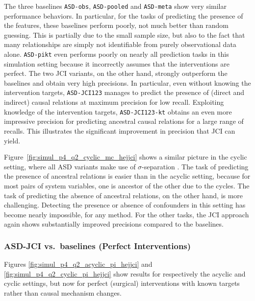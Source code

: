 \documentclass[twoside,11pt]{article}
\newcommand{\alg}[1]{\texttt{#1}}
\begin{document}
The three baselines \alg{ASD-obs}, \alg{ASD-pooled} and \alg{ASD-meta} show very similar performance behaviors.
In particular, for the tasks of predicting the presence of the features, these baselines perform poorly, not
much better than random guessing. This is partially due to the small sample size, but also to the fact that
many relationships are simply not identifiable from purely observational data alone.
\alg{ASD-pikt} even performs poorly on nearly all prediction tasks in this simulation setting because it 
incorrectly assumes that the interventions are perfect.
The two JCI variants, on the other hand, strongly outperform the baselines and obtain very high precisions. 
In particular, even without knowing the intervention targets, \alg{ASD-JCI123} manages to predict
the presence of (direct and indirect) causal relations at maximum precision for low recall. Exploiting knowledge of
the intervention targets, \alg{ASD-JCI123-kt} obtains an even more impressive precision 
for predicting ancestral causal relations for a large range of recalls. 
This illustrates the significant improvement in precision that JCI can yield.

Figure~\ref{fig:simul_p4_q2_cyclic_mc_hejjci} shows a similar picture in the cyclic setting, where all ASD variants
make use of $\sigma$-separation \citep{ForreMooij_UAI_18}. The task of predicting the presence of 
ancestral relations is easier than in the acyclic setting, because for most pairs of system variables, one is
ancestor of the other due to the cycles. The task of predicting the absence of ancestral
relations, on the other hand, is more challenging. Detecting the presence or absence of confounders in this setting
has become nearly impossible, for any method. For the other tasks, the JCI approach again
shows substantially improved precisions compared to the baselines. 

\subsubsection{ASD-JCI vs.\ baselines (Perfect Interventions)}

Figures \ref{fig:simul_p4_q2_acyclic_pi_hejjci} and \ref{fig:simul_p4_q2_cyclic_pi_hejjci} show 
results for respectively the acyclic and cyclic settings, but now for perfect (surgical) interventions 
with known targets rather than causal mechanism changes.
\end{document}
